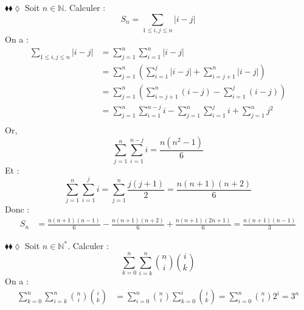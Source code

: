 \documentclass[11pt]{article}
\begin{document}
\begin{exercice}{$\blacklozenge\blacklozenge\lozenge$}{}
    Soit $n\in\mathbb{N}$. Calculer :
    \begin{equation*}
        S_n = \sum\limits_{1\leq i,j\leq n}{|i-j|}
    \end{equation*}
    \tcblower
    On a :
    \begin{align*}
        \sum\limits_{1\leq i,j\leq n}{|i-j|}
        &=\sum\limits^{n}_{j=1}{\sum\limits^{n}_{i=1}{|i-j|}}\\
        &=\sum\limits^{n}_{j=1}{\left(\sum\limits^{j}_{i=1}{|i-j|}+\sum\limits^{n}_{i=j+1}{|i-j|}\right)}\\
        &=\sum\limits^{n}_{j=1}{\left(\sum\limits^{n}_{i=j+1}{(i-j)}-\sum\limits^{j}_{i=1}{(i-j)}\right)}\\
        &=\sum\limits^{n}_{j=1}{\sum\limits^{n-j}_{i=1}{i}-\sum\limits^{n}_{j=1}\sum\limits^{j}_{i=1}{i}+\sum\limits^n_{j=1}j^2}\\
    \end{align*}
    Or,
    \begin{equation*}
        \sum^n_{j=1}{\sum^{n-j}_{i=1}{i}}=\frac{n(n^2-1)}{6}
    \end{equation*}
    Et :
    \begin{equation*}
        \sum^n_{j=1}\sum^j_{i=1}{i}=\sum^n_{j=1}{\frac{j(j+1)}{2}}=\frac{n(n+1)(n+2)}{6}
    \end{equation*}
    Donc :
    \begin{align*}
        S_n &= \frac{n(n+1)(n-1)}{6} - \frac{n(n+1)(n+2)}{6} + \frac{n(n+1)(2n+1)}{6} = \frac{n(n+1)(n-1)}{3}
    \end{align*}
\end{exercice}

\begin{exercice}{$\blacklozenge\blacklozenge\lozenge$}{}
    Soit $n\in\mathbb{N}^*$. Calculer :
    \begin{equation*}
        \sum^n_{k=0}\sum^n_{i=k}{\binom{n}{i}\binom{i}{k}}
    \end{equation*}
    \tcblower
    On a :
    \begin{align*}
        \sum^n_{k=0}\sum^n_{i=k}{\binom{n}{i}\binom{i}{k}}&=\sum^n_{i=0}\binom{n}{i}\sum^i_{k=0}\binom{i}{k}=\sum^n_{i=0}\binom{n}{i}2^i=3^n
    \end{align*}
\end{exercice}

\pagebreak
\end{document}
